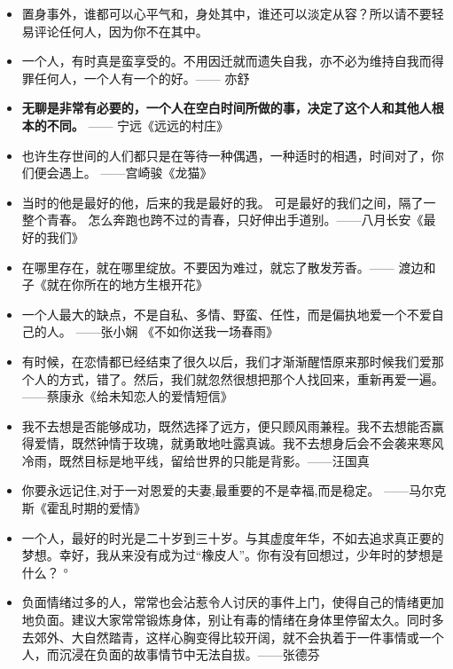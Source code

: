 \documentclass[UTF8,a4paper,8pt]{ctexart}
\begin{document}
\begin{itemize}
 	\item 置身事外，谁都可以心平气和，身处其中，谁还可以淡定从容？所以请不要轻易评论任何人，因为你不在其中。
 	
 	\item 一个人，有时真是蛮享受的。不用因迁就而遗失自我，亦不必为维持自我而得罪任何人，一个人有一个的好。—— 亦舒
 	
 	\item \textbf{无聊是非常有必要的，一个人在空白时间所做的事，决定了这个人和其他人根本的不同。} —— 宁远《远远的村庄》
 	
 	\item 也许生存世间的人们都只是在等待一种偶遇，一种适时的相遇，时间对了，你们便会遇上。 ——宫崎骏《龙猫》
 	
 	\item 当时的他是最好的他，后来的我是最好的我。 可是最好的我们之间，隔了一整个青春。 怎么奔跑也跨不过的青春，只好伸出手道别。——八月长安《最好的我们》
 	
 	\item 在哪里存在，就在哪里绽放。不要因为难过，就忘了散发芳香。—— 渡边和子《就在你所在的地方生根开花》
 	
 	\item 一个人最大的缺点，不是自私、多情、野蛮、任性，而是偏执地爱一个不爱自己的人。	——张小娴 《不如你送我一场春雨》
 	
 	\item 有时候，在恋情都已经结束了很久以后，我们才渐渐醒悟原来那时候我们爱那个人的方式，错了。然后，我们就忽然很想把那个人找回来，重新再爱一遍。——蔡康永《给未知恋人的爱情短信》
 	
 	\item 我不去想是否能够成功，既然选择了远方，便只顾风雨兼程。我不去想能否赢得爱情，既然钟情于玫瑰，就勇敢地吐露真诚。我不去想身后会不会袭来寒风冷雨，既然目标是地平线，留给世界的只能是背影。——汪国真 
 	
 	\item 你要永远记住,对于一对恩爱的夫妻,最重要的不是幸福,而是稳定。 ——马尔克斯《霍乱时期的爱情》
 	
 	\item 一个人，最好的时光是二十岁到三十岁。与其虚度年华，不如去追求真正要的梦想。幸好，我从来没有成为过“橡皮人”。你有没有回想过，少年时的梦想是什么？ °
 	
 	\item 负面情绪过多的人，常常也会沾惹令人讨厌的事件上门，使得自己的情绪更加地负面。建议大家常常锻炼身体，别让有毒的情绪在身体里停留太久。同时多去郊外、大自然踏青，这样心胸变得比较开阔，就不会执着于一件事情或一个人，而沉浸在负面的故事情节中无法自拔。——张德芬
 	

\end{itemize}
\end{document}
